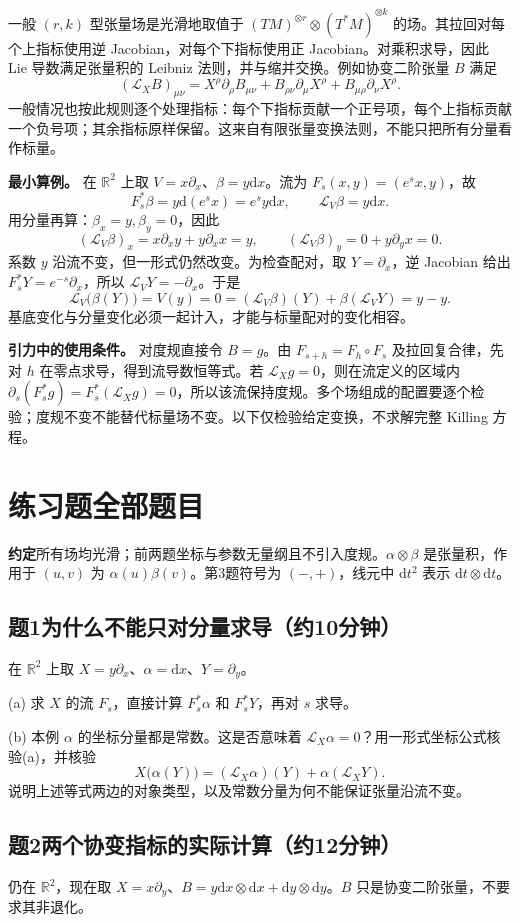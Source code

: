 \documentclass[11pt,a4paper]{article}
\newcommand{\D}{\mathrm d}\newcommand{\Lie}{\mathcal L}
\newcommand{\head}[1]{\section*{\color{teal}#1}}
\begin{document}
一般 $(r,k)$ 型张量场是光滑地取值于 $(TM)^{\otimes r}\otimes(T^*M)^{\otimes k}$ 的场。其拉回对每个上指标使用逆 Jacobian，对每个下指标使用正 Jacobian。对乘积求导，因此 Lie 导数满足张量积的 Leibniz 法则，并与缩并交换。例如协变二阶张量 $B$ 满足
\[
 (\Lie_XB)_{\mu\nu}
 =X^\rho\partial_\rho B_{\mu\nu}
 +B_{\rho\nu}\partial_\mu X^\rho+B_{\mu\rho}\partial_\nu X^\rho.
\]
一般情况也按此规则逐个处理指标：每个下指标贡献一个正号项，每个上指标贡献一个负号项；其余指标原样保留。这来自有限张量变换法则，不能只把所有分量看作标量。

\textbf{最小算例。} 在 $\mathbb R^2$ 上取 $V=x\partial_x$、$\beta=y\D x$。流为 $F_s(x,y)=(e^sx,y)$，故
\[
 F_s^*\beta=y\D(e^sx)=e^sy\D x,
 \qquad \Lie_V\beta=y\D x.
\]
用分量再算：$\beta_x=y,\beta_y=0$，因此
\[
 (\Lie_V\beta)_x=x\partial_xy+y\partial_xx=y,\qquad
 (\Lie_V\beta)_y=0+y\partial_yx=0.
\]
系数 $y$ 沿流不变，但一形式仍然改变。为检查配对，取 $Y=\partial_x$，逆 Jacobian 给出 $F_s^*Y=e^{-s}\partial_x$，所以 $\Lie_VY=-\partial_x$。于是
\[
 \Lie_V\bigl(\beta(Y)\bigr)=V(y)=0
 = (\Lie_V\beta)(Y)+\beta(\Lie_VY)=y-y.
\]
基底变化与分量变化必须一起计入，才能与标量配对的变化相容。

\textbf{引力中的使用条件。} 对度规直接令 $B=g$。由 $F_{s+h}=F_h\circ F_s$ 及拉回复合律，先对 $h$ 在零点求导，得到流导数恒等式。若 $\Lie_Xg=0$，则在流定义的区域内 $\partial_s(F_s^*g)=F_s^*(\Lie_Xg)=0$，所以该流保持度规。多个场组成的配置要逐个检验；度规不变不能替代标量场不变。以下仅检验给定变换，不求解完整 Killing 方程。
\newpage
\head{练习题\quad 全部题目}
\textbf{约定}\quad 所有场均光滑；前两题坐标与参数无量纲且不引入度规。$\alpha\otimes\beta$ 是张量积，作用于 $(u,v)$ 为 $\alpha(u)\beta(v)$。第3题符号为 $(-,+)$，线元中 $\D t^2$ 表示 $\D t\otimes\D t$。
\subsection*{题1\quad 为什么不能只对分量求导（约10分钟）}
在 $\mathbb R^2$ 上取 $X=y\partial_x$、$\alpha=\D x$、$Y=\partial_y$。

(a) 求 $X$ 的流 $F_s$，直接计算 $F_s^*\alpha$ 和 $F_s^*Y$，再对 $s$ 求导。

(b) 本例 $\alpha$ 的坐标分量都是常数。这是否意味着 $\Lie_X\alpha=0$？用一形式坐标公式核验(a)，并核验
\[
 X\bigl(\alpha(Y)\bigr)=(\Lie_X\alpha)(Y)+\alpha(\Lie_XY).
\]
说明上述等式两边的对象类型，以及常数分量为何不能保证张量沿流不变。
\subsection*{题2\quad 两个协变指标的实际计算（约12分钟）}
仍在 $\mathbb R^2$，现在取 $X=x\partial_y$、$B=y\D x\otimes\D x+\D y\otimes\D y$。$B$ 只是协变二阶张量，不要求其非退化。
\end{document}

